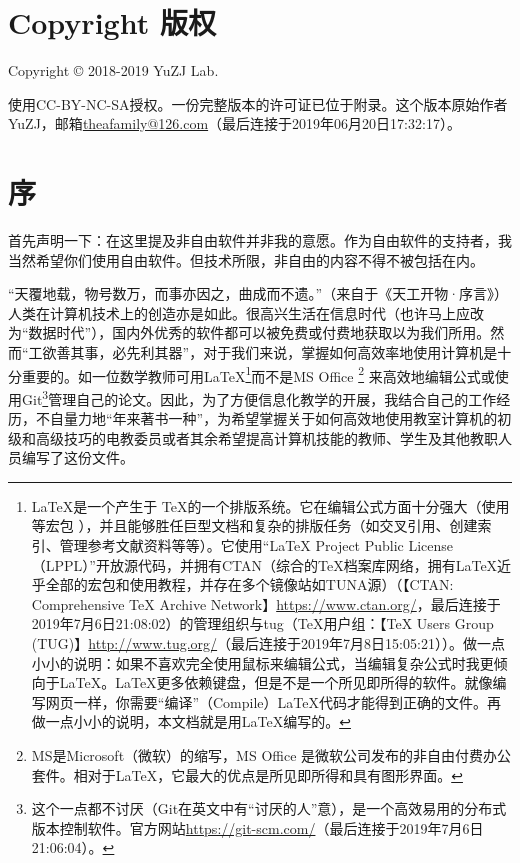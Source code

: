 \section{Copyright 版权}
Copyright \copyright{} 2018-2019 YuZJ Lab. \par
使用CC-BY-NC-SA授权。一份完整版本的许可证已位于附录。这个版本原始作者YuZJ，邮箱\url{theafamily@126.com}（最后连接于2019年06月20日17:32:17）。
\begin{center}\large \bf {\color{red}{对本文档所引起的任何后果不作担保！}}\normalall\end{center}
\section{序}
首先声明一下：在这里提及非自由软件并非我的意愿。作为自由软件的支持者，我当然希望你们使用自由软件。但技术所限，非自由的内容不得不被包括在内。\par
“天覆地载，物号数万，而事亦因之，曲成而不遗。”（来自于《天工开物·序言》）人类在计算机技术上的创造亦是如此。很高兴生活在信息时代（也许马上应改为“数据时代”），国内外优秀的软件都可以被免费或付费地获取以为我们所用。然而“工欲善其事，必先利其器”，对于我们来说，掌握如何高效率地使用计算机是十分重要的。如一位数学教师可用\LaTeX\footnote{\LaTeX 是一个产生于 \TeX 的一个排版系统。它在编辑公式方面十分强大（使用 \AmSTeX 等宏包 ），并且能够胜任巨型文档和复杂的排版任务（如交叉引用、创建索引、管理参考文献资料等等）。它使用“LaTeX Project Public Li­cense （LPPL）”开放源代码，并拥有CTAN（综合的TeX档案库网络，拥有\LaTeX 近乎全部的宏包和使用教程，并存在多个镜像站如TUNA源）（【CTAN: Comprehensive TeX Archive Network】\url{https://www.ctan.org/}，最后连接于2019年7月6日21:08:02）的管理组织与tug（\TeX 用户组：【TeX Users Group (TUG)】\url{http://www.tug.org/}（最后连接于2019年7月8日15:05:21））。做一点小小的说明：如果不喜欢完全使用鼠标来编辑公式，当编辑复杂公式时我更倾向于\LaTeX。\LaTeX 更多依赖键盘，但是不是一个所见即所得的软件。就像编写网页一样，你需要“编译”（Compile）\LaTeX 代码才能得到正确的文件。再做一点小小的说明，本文档就是用\LaTeX 编写的。}而不是MS Office \footnote{MS是Microsoft（微软）的缩写，MS Office 是微软公司发布的非自由付费办公套件。相对于\LaTeX ，它最大的优点是所见即所得和具有图形界面。} 来高效地编辑公式或使用Git\footnote{这个一点都不讨厌（Git在英文中有“讨厌的人”意），是一个高效易用的分布式版本控制软件。官方网站\url{https://git-scm.com/}（最后连接于2019年7月6日21:06:04）。}管理自己的论文。因此，为了方便信息化教学的开展，我结合自己的工作经历，不自量力地“年来著书一种”，为希望掌握关于如何高效地使用教室计算机的初级和高级技巧的电教委员或者其余希望提高计算机技能的教师、学生及其他教职人员编写了这份文件。\par
